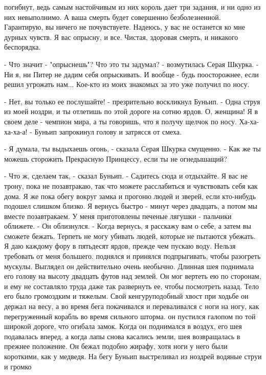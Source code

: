 погибнут, ведь самым настойчивым из них король дает три задания, и ни 
одно из них невыполнимо. А ваша смерть будет совершенно 
безболезненной. Гарантирую, вы ничего не почувствуете. Надеюсь, у вас 
не останется ко мне дурных чувств. Я вас опрысну, и все. Чистая, 
здоровая смерть, и никакого беспорядка.
\par- Что значит - "опрыснешь"? Что это ты задумал? - возмутилась 
Серая Шкурка. - Ни я, ни Питер не дадим себя опрыскивать. И вообще - 
будь поосторожнее, если решил угрожать нам... Кое-кто из моих знакомых 
за это уже получил по носу.
\par- Нет, вы только ее послушайте! - презрительно воскликнул Буньип. 
- Одна струя из моей ноздри, и ты отлетишь по этой дороге на сотню 
ярдов. О, женщина! Я в своем деле - чемпион мира, а ты говоришь, что я 
получу щелчок по носу. Ха-ха-ха-ха-а! - Буньип запрокинул голову и 
затрясся от смеха.
\par- Я думала, ты выдыхаешь огонь, - сказала Серая Шкурка смущенно. - 
Как же ты можешь сторожить Прекрасную Принцессу, если ты не 
огнедышащий?
\par- Что ж, сделаем так, - сказал Буньип. - Садитесь сюда и 
отдыхайте. Я вас не трону, пока не позавтракаю, так что можете 
расслабиться и чувствовать себя как дома. Я же пока обегу вокруг замка 
и прогоню людей и зверей, если кто-нибудь подошел слишком близко. Я 
вернусь быстро - минут через двадцать, а потом мы вместе позавтракаем. 
У меня приготовлены печеные лягушки - пальчики оближете. - Он 
облизнулся. - Когда вернусь, я расскажу вам о себе, а затем вы сможете 
бежать. Терпеть не могу убивать людей, которые не пытаются убежать. Я 
даю каждому фору в пятьдесят ярдов, прежде чем пускаю воду. Нельзя 
требовать от меня большего.
 поднялся и принялся подпрыгивать, чтобы разогреть мускулы. 
Выглядел он действительно очень необычно. Длинная шея поднимала его 
голову на высоту двадцать футов над землей. Он мог вертеть ею по 
сторонам, и ему не составляло труда даже так развернуть ее, чтобы 
посмотреть назад. Тело его было громоздким и тяжелым. Свой 
кенгуруподобный хвост при ходьбе он держал на весу, а во время бега 
покачивался и переваливался с ноги на ногу, как перегруженный корабль 
во время сильного шторма.
 он пустился галопом по той широкой дороге, что огибала 
замок. Когда он поднимался в воздух, его шея подавалась вперед, а 
когда лапы снова касались земли, шея возвращалась в прежнее положение. 
Он бежал подобно жирафу, хотя ноги у него были короткими, как у 
медведя. На бегу Буньип выстреливал из ноздрей водяные струи и громко 
